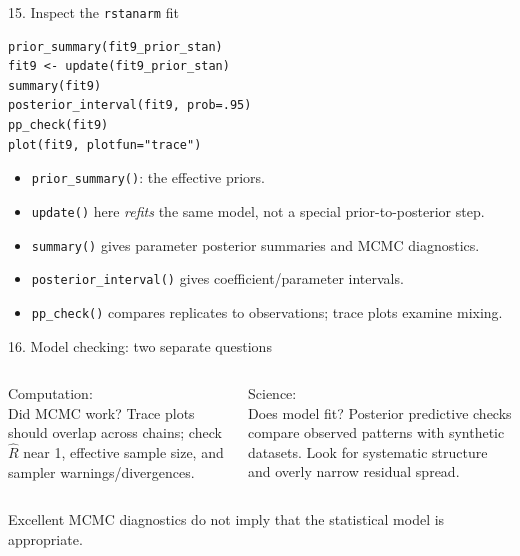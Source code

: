 \documentclass[aspectratio=43,10pt]{beamer}
\newcommand{\take}[1]{\begin{block}{}#1\end{block}}
\begin{document}
\begin{frame}[fragile]{15. Inspect the \texttt{rstanarm} fit}
\begin{lstlisting}
prior_summary(fit9_prior_stan)
fit9 <- update(fit9_prior_stan)
summary(fit9)
posterior_interval(fit9, prob=.95)
pp_check(fit9)
plot(fit9, plotfun="trace")
\end{lstlisting}
\begin{itemize}\item \texttt{prior\_summary()}: the effective priors.
\item \texttt{update()} here \emph{refits} the same model, not a special prior-to-posterior step.
\item \texttt{summary()} gives parameter posterior summaries and MCMC diagnostics.
\item \texttt{posterior\_interval()} gives coefficient/parameter intervals.
\item \texttt{pp\_check()} compares replicates to observations; trace plots examine mixing.
\end{itemize}
\end{frame}

\begin{frame}{16. Model checking: two separate questions}
\begin{columns}[T]
\begin{block}{Computation:\\Did MCMC work?}
Trace plots should overlap across chains; check \(\widehat R\) near 1, effective sample size, and sampler warnings/divergences.
\end{block}
\begin{block}{Science:\\Does model fit?}
Posterior predictive checks compare observed patterns with synthetic datasets. Look for systematic structure and overly narrow residual spread.
\end{block}
\end{columns}
\vspace{.4cm}
\take{Excellent MCMC diagnostics do not imply that the statistical model is appropriate.}
\end{frame}

\end{document}
